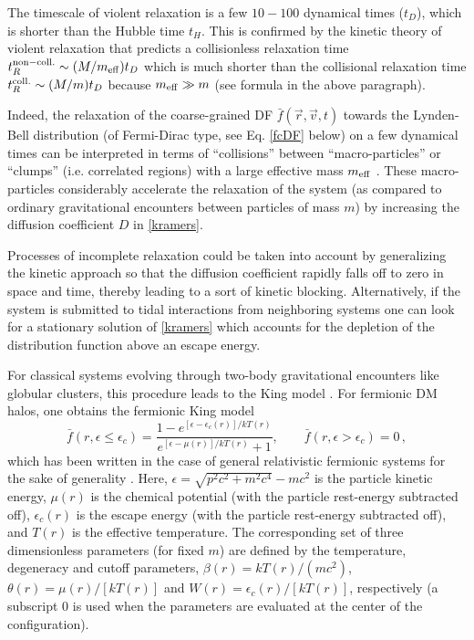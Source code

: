 The timescale of violent relaxation is a few $10-100$ dynamical times ($t_D$), which is shorter than the Hubble time $t_H$. This is confirmed by the kinetic theory of violent relaxation that predicts a collisionless relaxation time $t_R^{\rm non-coll.}\sim (M/m_{\rm eff})t_D$ which is much shorter than the collisional relaxation time $t_R^{\rm coll.}\sim (M/m)t_D$ because $m_{\rm eff}\gg m$ (see formula in the above paragraph).

Indeed, the relaxation of the coarse-grained DF $\bar{f}({\vec r},{\vec v},t)$ towards the Lynden-Bell distribution (of Fermi-Dirac type, see Eq. \ref{fcDF} below) on a few dynamical times can be interpreted in terms of ``collisions'' between  ``macro-particles'' or ``clumps'' (i.e. correlated regions) with a large effective mass $m_{\rm
eff}$ \citep{1970PhRvL..25.1155K}. These macro-particles considerably accelerate the relaxation of the system (as compared to ordinary gravitational encounters between particles of mass $m$) by increasing the diffusion coefficient $D$ in \cref{kramers}. 

Processes of incomplete relaxation could be taken into account by generalizing the kinetic approach so that the diffusion coefficient rapidly falls off to zero in space and time, thereby leading to a sort of kinetic blocking. Alternatively, if the system is submitted to tidal interactions from neighboring systems one can look for a stationary solution of \cref{kramers} which accounts for the depletion of the distribution function above an escape energy.

For classical systems evolving through two-body gravitational encounters like globular clusters, this procedure leads to the King model \citep{1962AJ.....67..471K}. For fermionic DM halos, one obtains the fermionic King model \citep{1983A&A...119...35R,1998MNRAS.300..981C} 
%
\begin{equation}
    \bar{f}(r,\epsilon\leq\epsilon_c) = \frac{1-e^{[\epsilon-\epsilon_c(r)]/kT(r)}}{e^{[\epsilon-\mu(r)]/kT(r)}+1}, \qquad \bar{f}(r,\epsilon>\epsilon_c)=0\, ,
    \label{fcDF}
\end{equation} 
%
which has been written in the case of general relativistic fermionic systems for the sake of generality \citep{2018PDU....21...82A,2022IJMPD..3130002A}. Here, $\epsilon=\sqrt{p^2c^2 + m^2 c^4} - mc^2$ is the particle kinetic energy, $\mu(r)$ is the chemical potential (with the particle rest-energy subtracted off), $\epsilon_c(r)$ is the escape energy (with the particle rest-energy subtracted off), and $T(r)$ is the effective temperature. The corresponding set of three dimensionless parameters (for fixed $m$) are defined by the temperature, degeneracy and cutoff parameters, $\beta(r)=k T(r)/(m c^2)$, $\theta(r)=\mu(r)/[k T(r)]$ and $W(r)=\epsilon_c(r)/[k T(r)]$, respectively (a subscript $0$ is used when the parameters are evaluated at the center of the configuration).

